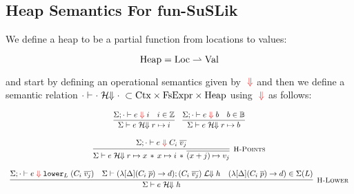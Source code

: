 \documentclass[10pt]{article}
\begin{document}



%

\subsection{Heap Semantics For fun-SuSLik}

We define a heap to be a partial function from locations to values:

\begin{equation*}
  \textnormal{Heap} = \textnormal{Loc} \rightharpoonup \textnormal{Val}
\end{equation*}

\noindent
and start by defining an operational semantics given by ${\color{red}\;{\Downarrow}}$ and then we
define a semantic relation $\cdot \vdash \cdot \;\mathcal{H}\!\!\Downarrow \cdot\; \subset \textnormal{Ctx} \times \textnormal{FsExpr} \times \textnormal{Heap}$ using ${\color{red}\;{\Downarrow}}$ as follows:

\[
  \begin{array}{c}
    \infer{\Sigma \vdash e \Hbigs r \pointsto i}{\Sigma ; \cdot \vdash e \bigs\; i & i \in \mathbb{Z}}
    ~~~
    \infer{\Sigma \vdash e \Hbigs r \pointsto b}{\Sigma ; \cdot \vdash e \bigs\; b & b \in \mathbb{B}}
    \\\\
    \labinfer[H-Points]{\Sigma \vdash e \Hbigs r \pointsto x \sep x \pointsto i \sep \overline{(x+j) \pointsto v_j}}{\Sigma ; \cdot \vdash e \bigs\; C_i\; \overline{v_j}}
    \\\\
    \labinfer[H-Lower]{\Sigma \vdash e \Hbigs h}
      {\Sigma; \cdot \vdash e \bigs\; \lowerS{L} (C_i\; \overline{v_j})
      & \Sigma \vdash (\lambda[\Delta] (C_i\; \overline{p}) \ra d); (C_i\; \overline{v_j}) \Lbigs h
      & (\lambda[\Delta] (C_i\; \overline{p}) \ra d) \in \Sigma(L)
      }
  \end{array}
\]
\end{document}
